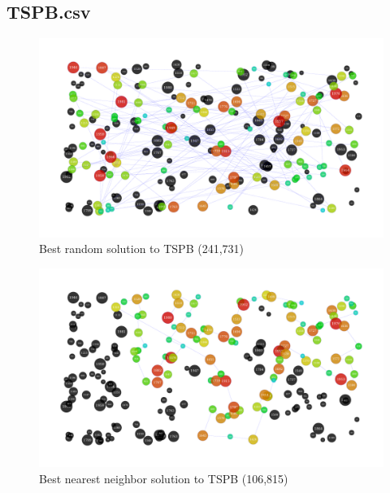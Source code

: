\documentclass[14pt]{article}
\begin{document}
\subsection{TSPB.csv}
\begin{figure}[H]
	\begin{adjustwidth}{-3em}{0}
		\includegraphics{results/best_random_TSPB.pdf}
	\end{adjustwidth}
	\vspace{-15mm}
	\caption{Best random solution to TSPB (241,731)}
\end{figure}
\begin{figure}[H]
	\begin{adjustwidth}{-3em}{0}
		\includegraphics{results/best_nearest-neighbor_TSPB.pdf}
	\end{adjustwidth}
	\vspace{-15mm}
	\caption{Best nearest neighbor solution to TSPB (106,815)}
\end{figure}
\end{document}
